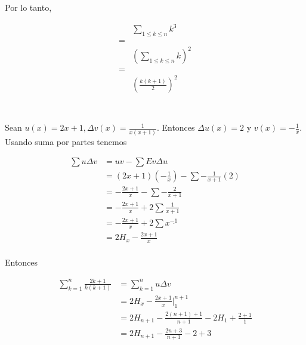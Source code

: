\documentclass{article}
\begin{document}
Por lo tanto,

\begin{align*}
 & \sum_{1 \leq k \leq n} k^3 \\
 = & \\
 & \left(\sum_{1 \leq k \leq n} k \right)^2 \\
 = & \\
 & \left( \frac{k(k+1)}{2} \right)^2 \\
\end{align*}

\section{} %

\subsection{} %

\subsection{} %

Sean $u(x) = 2x+1, \Delta v(x) = \frac{1}{x(x+1)}$. Entonces $\Delta u(x) = 2$
y $v(x) = -\frac{1}{x}$. Usando suma por partes tenemos


\begin{align*}
\sum u \Delta v & = uv - \sum Ev \Delta u \\
 & = (2x+1)(-\frac{1}{x}) - \sum -\frac{1}{x+1}(2) \\
 & = -\frac{2x+1}{x} - \sum -\frac{2}{x+1} \\
 & = -\frac{2x+1}{x} + 2\sum \frac{1}{x+1} \\
 & = -\frac{2x+1}{x} + 2\sum x^{\underline{-1}} \\
 & = 2H_x - \frac{2x+1}{x} \\
\end{align*}

Entonces

\begin{align*}
\sum_{k=1}^n \frac{2k+1}{k(k+1)} & = \sum_{k=1}^n u \Delta v \\
             & = 2H_x -\frac{2x+1}{x} \Big |_{1}^{n+1} \\
             & = 2H_{n+1} -\frac{2(n+1)+1}{n+1} - 2H_1 + \frac{2+1}{1} \\
             & = 2H_{n+1} -\frac{2n+3}{n+1} - 2 + 3 \\
\end{align*}

\section{} %

\section{} %
\end{document}
